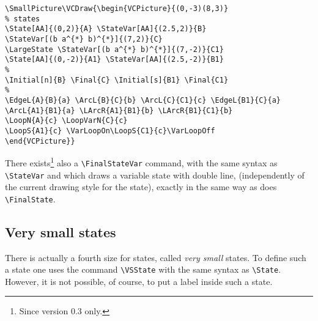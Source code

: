 \documentclass[11pt,twoside]{article}
\newlength{\parindenttemp} %
\newcommand{\noi}{\noindent}
\newlength{\jsIndent}%
\newlength{\ColSource}%
\newlength{\ColFigur}%
\begin{document}
\noi 
\hspace*{-\jsIndent}
\begin{minipage}[c]{\ColFigur}%
\par\vspace*{0mm}%
\begin{center}
\SmallPicture{}%
\end{center}
\end{minipage}%
\hspace*{1.2em}%
\begin{minipage}[c]{\ColSource}
\setlength{\parindent}{\parindenttemp}%
\par\vspace*{0mm}%
\footnotesize
\begin{verbatim}
\SmallPicture\VCDraw{\begin{VCPicture}{(0,-3)(8,3)}
% states
\State[AA]{(0,2)}{A} \StateVar[AA]{(2.5,2)}{B} 
\StateVar[(b a^{*} b)^{*}]{(7,2)}{C} 
\LargeState \StateVar[(b a^{*} b)^{*}]{(7,-2)}{C1} 
\State[AA]{(0,-2)}{A1} \StateVar[AA]{(2.5,-2)}{B1} 
%
\Initial[n]{B} \Final{C} \Initial[s]{B1} \Final{C1}
%
\EdgeL{A}{B}{a} \ArcL{B}{C}{b} \ArcL{C}{C1}{c} \EdgeL{B1}{C}{a} 
\ArcL{A1}{B1}{a} \LArcR{A1}{B1}{b} \LArcR{B1}{C1}{b} 
\LoopN{A}{c} \LoopVarN{C}{c}
\LoopS{A1}{c} \VarLoopOn\LoopS{C1}{c}\VarLoopOff
\end{VCPicture}}
\end{verbatim}
\normalsize
\end{minipage}

\medskip 

\noi
There exists\footnote{%
   Since version 0.3 only.}
also a \verb+\FinalStateVar+  command, with the same syntax as 
\verb+\StateVar+ and which draws a variable state with double line, 
(independently of the current drawing style for the state), exactly 
in the same way as does \verb+\FinalState+.
%

\subsection{Very small states}\label{subsec.siz2}
There is actually a fourth size for states, called \emph{very small} states.
To define such a state one uses the command \verb+\VSState+ with
the same syntax as \verb+\State+. However, it is not possible, of course,
to put a label inside such a state.
\end{document}
